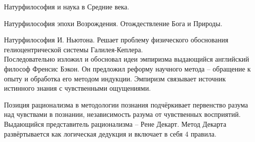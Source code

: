 \documentclass[exam_answers.tex]{subfiles}
\begin{document}
Натурфилософия и наука в Средние века.

Натурфилософия эпохи Возрождения.
Отождествление Бога и Природы.

Натурфилософия И. Ньютона.
Решает проблему физического обоснования гелиоцентрической системы Галилея-Кеплера.
\\

Последовательно изложил и обосновал идеи эмпиризма выдающийся английский философ Френсис Бэкон.
Он предложил реформу научного метода – обращение к опыту и обработка его методом индукции.
Эмпиризм связывает источник истинного знания с чувственными ощущениями.

Позиция рационализма в методологии познания подчёркивает первенство разума над чувствами в познании, независимость разума от чувственных восприятий.
Выдающийся представитель рационализма – Рене Декарт.
Метод Декарта развёртывается как логическая дедукция и включает в себя 4 правила.
\end{document}
